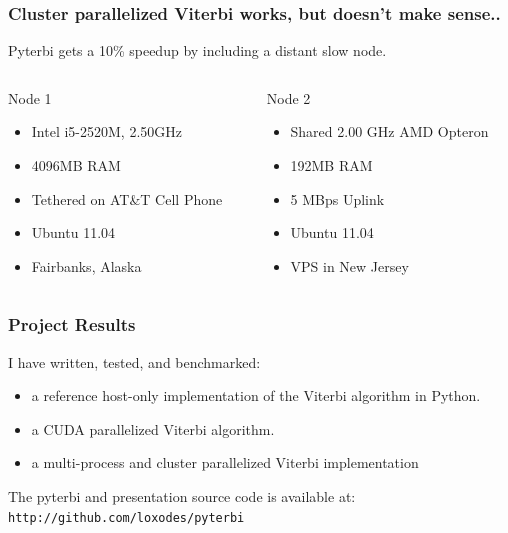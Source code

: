 \documentclass{beamer}
\begin{document}
    \begin{frame}
        \frametitle{Cluster parallelized Viterbi works, but doesn't make sense..}
        Pyterbi gets a 10\% speedup by including a distant slow node.      
        \begin{columns}[t]
            \begin{column}[t]{.5\linewidth}
            \begin{block}{Node 1}
            \begin{itemize}
                \item Intel i5-2520M, 2.50GHz
                \item 4096MB RAM
                \item Tethered on AT\&T Cell Phone
                \item Ubuntu 11.04
                \item Fairbanks, Alaska
            \end{itemize}
            \end{block}
            \end{column}
            
            \begin{column}[t]{.5\linewidth}
            \begin{block}{Node 2}
            \begin{itemize}
                \item Shared 2.00 GHz AMD Opteron
                \item 192MB RAM
                \item 5 MBps Uplink
                \item Ubuntu 11.04
                \item VPS in New Jersey
            \end{itemize}
            \end{block}
            \end{column}
        \end{columns}
    \end{frame}

    \begin{frame}
        \frametitle{Project Results}
        I have written, tested, and benchmarked:
        \begin{itemize}
            \item a reference host-only implementation of the Viterbi algorithm in Python. 
            \item a CUDA parallelized Viterbi algorithm.
            \item a multi-process and cluster parallelized Viterbi implementation 
        \end{itemize}

        The pyterbi and presentation source code is available at: \texttt{http://github.com/loxodes/pyterbi}
   \end{frame}
\end{document}
